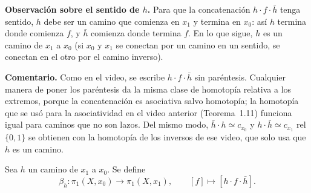 \documentclass[11pt]{article}
\begin{document}
\medskip\noindent\textbf{Observación sobre el sentido de $h$.} Para que la concatenación $h\cdot f\cdot\bar h$ tenga sentido, $h$ debe ser un camino que comienza en $x_1$ y termina en $x_0$: así $h$ termina donde comienza $f$, y $\bar h$ comienza donde termina $f$. En lo que sigue, $h$ es un camino de $x_1$ a $x_0$ (si $x_0$ y $x_1$ se conectan por un camino en un sentido, se conectan en el otro por el camino inverso).

\medskip\noindent\textbf{Comentario.} Como en el video, se escribe $h\cdot f\cdot\bar h$ sin paréntesis. Cualquier manera de poner los paréntesis da la misma clase de homotopía relativa a los extremos, porque la concatenación es asociativa salvo homotopía; la homotopía que se usó para la asociatividad en el video anterior (Teorema~1.11) funciona igual para caminos que no son lazos. Del mismo modo, $\bar h\cdot h\simeq c_{x_0}$ y $h\cdot\bar h\simeq c_{x_1}$ rel $\{0,1\}$ se obtienen con la homotopía de los inversos de ese video, que solo usa que $h$ es un camino.

\begin{defn}
Sea $h$ un camino de $x_1$ a $x_0$. Se define
\[
  \beta_h\colon \pi_1(X,x_0)\longrightarrow\pi_1(X,x_1),
  \qquad
  [f]\longmapsto[h\cdot f\cdot\bar h].
\]
\end{defn}
\end{document}
